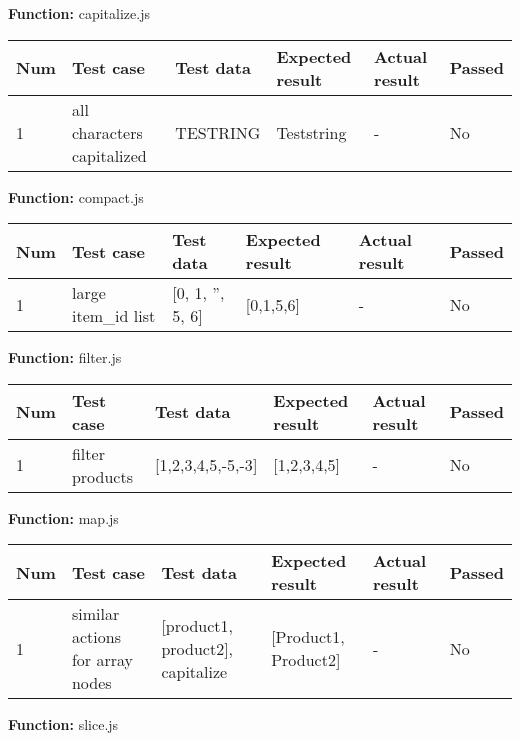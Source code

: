 \documentclass[a4paper, 12pt]{article}
\begin{document}
        \textbf{Function:} capitalize.js
    
        \begin{table}[h!]
            \begin{tabular}{|l|p{3cm}|p{2cm}|p{2cm}|p{2.5cm}|l|}
                \hline
                Num & Test case        					& Test data 					& Expected result 					& Actual result 		& Passed \\ \hline
                1   & all characters capitalized 		& TESTRING     					& Teststring            			& -             		& No     \\ \hline
            \end{tabular}
        \end{table}
    
        \textbf{Function:} compact.js
        
        \begin{table}[h!]
           \begin{tabular}{|l|p{3cm}|p{2cm}|p{2cm}|p{2.5cm}|l|}
                \hline
                Num & Test case        					& Test data 					& Expected result 					& Actual result 		& Passed \\ \hline
                1   & large item\_id list 				& {[}0, 1, '', 5, 6{]}     		& {[}0,1,5,6{]}               		& -             		& No     \\ \hline
            \end{tabular}
        \end{table}
    
        \textbf{Function:} filter.js
        
        \begin{table}[h!]
           \begin{tabular}{|l|p{3cm}|p{2cm}|p{2cm}|p{2.5cm}|l|}
                \hline
                Num & Test case        					& Test data 					& Expected result 					& Actual result 		& Passed \\ \hline
                1   & filter products 					& {[}1,2,3,4,5,-5,-3{]}     	& {[}1,2,3,4,5{]}               	& -             		& No     \\ \hline
            \end{tabular}
        \end{table}

\newpage 
    
        \textbf{Function:} map.js
        
        \begin{table}[h!]
           \begin{tabular}{|l|p{3cm}|p{2cm}|p{2cm}|p{2.5cm}|l|}
                \hline
                Num & Test case        					& Test data 									& Expected result 					& Actual result 		& Passed \\ \hline
                1   & similar actions for array nodes 	& {[}product1, product2{]}, capitalize     		& {[}Product1, Product2{]}          & -             		& No     \\ \hline
            \end{tabular}
        \end{table}
        \textbf{Function:} slice.js
        
\end{document}
